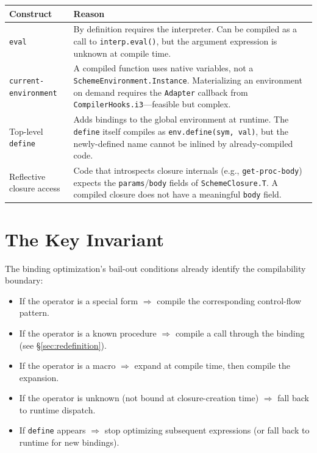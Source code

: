 \documentclass[12pt]{report}
\begin{document}
\begin{center}
\begin{longtable}{lp{9cm}}
\toprule
\textbf{Construct} & \textbf{Reason} \\
\midrule
\endhead
\texttt{eval} &
  By definition requires the interpreter.  Can be compiled as a
  call to \texttt{interp.eval()}, but the argument expression is
  unknown at compile time. \\
\texttt{current-environment} &
  A compiled function uses native variables, not a
  \texttt{SchemeEnvironment.Instance}.  Materializing an environment
  on demand requires the \texttt{Adapter} callback from
  \texttt{CompilerHooks.i3}---feasible but complex. \\
Top-level \texttt{define} &
  Adds bindings to the global environment at runtime.  The
  \texttt{define} itself compiles as \texttt{env.define(sym, val)},
  but the newly-defined name cannot be inlined by already-compiled
  code. \\
Reflective closure access &
  Code that introspects closure internals (e.g.,
  \texttt{get-proc-body}) expects the \texttt{params}/\texttt{body}
  fields of \texttt{SchemeClosure.T}.  A compiled closure does not
  have a meaningful \texttt{body} field. \\
\bottomrule
\end{longtable}
\end{center}

\section{The Key Invariant}

The binding optimization's bail-out conditions already identify the
compilability boundary:

\begin{itemize}
\item If the operator is a special form $\Rightarrow$ compile the
  corresponding control-flow pattern.
\item If the operator is a known procedure $\Rightarrow$ compile a
  call through the binding (see \S\ref{sec:redefinition}).
\item If the operator is a macro $\Rightarrow$ expand at compile time,
  then compile the expansion.
\item If the operator is unknown (not bound at closure-creation time)
  $\Rightarrow$ fall back to runtime dispatch.
\item If \texttt{define} appears $\Rightarrow$ stop optimizing
  subsequent expressions (or fall back to runtime for new bindings).
\end{itemize}
\end{document}
